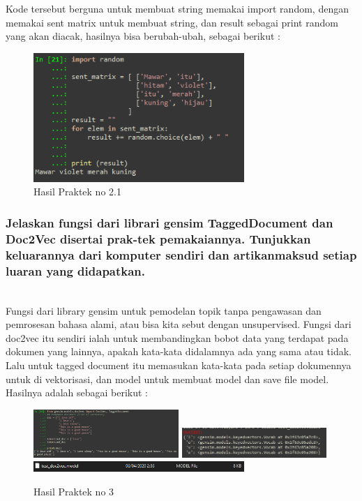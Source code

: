 
Kode tersebut berguna untuk membuat string memakai import random, dengan memakai sent matrix untuk membuat string, dan result sebagai print random yang akan diacak, hasilnya bisa berubah-ubah, sebagai berikut :
\begin{figure}[H]
	\centering
	\includegraphics[width=8cm]{figures/1174083/figures5/36.png}
	\caption{Hasil Praktek no 2.1}
\end{figure}

\subsubsection{Jelaskan fungsi dari librari gensim TaggedDocument dan Doc2Vec disertai prak-tek pemakaiannya. Tunjukkan keluarannya dari komputer sendiri dan artikanmaksud setiap luaran yang didapatkan.}
\hfill\\

Fungsi dari library gensim untuk pemodelan topik tanpa pengawasan dan pemrosesan bahasa alami, atau bisa kita sebut dengan unsupervised. Fungsi dari doc2vec itu sendiri ialah untuk membandingkan bobot data yang terdapat pada dokumen yang lainnya, apakah kata-kata didalamnya ada yang sama atau tidak. Lalu untuk tagged document itu memasukan kata-kata pada setiap dokumennya untuk di vektorisasi, dan model untuk membuat model dan save file model. Hasilnya adalah sebagai berikut :
\begin{figure}[H]
	\centering
	\includegraphics[width=5.5cm]{figures/1174083/figures5/37.png}
	\includegraphics[width=5.5cm]{figures/1174083/figures5/38.png}
	\includegraphics[width=8cm]{figures/1174083/figures5/39.png}		
	\caption{Hasil Praktek no 3}
\end{figure}


